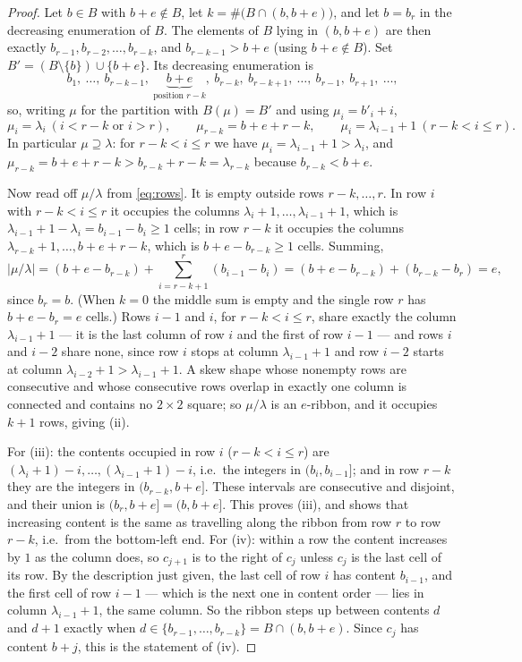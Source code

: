 \documentclass[11pt]{article}
\theoremstyle{definition}
\begin{document}
\begin{proof}
Let $b\in B$ with $b+e\notin B$, let $k=\#\bigl(B\cap(b,b+e)\bigr)$, and let $b=b_r$ in the
decreasing enumeration of $B$. The elements of $B$ lying in $(b,b+e)$ are then exactly
$b_{r-1},b_{r-2},\dots,b_{r-k}$, and $b_{r-k-1}>b+e$ (using $b+e\notin B$). Set
$B'=(B\setminus\{b\})\cup\{b+e\}$. Its decreasing enumeration is
\[
b_1,\ \dots,\ b_{r-k-1},\ \underbrace{b+e}_{\text{position }r-k},\ b_{r-k},\ b_{r-k+1},\ \dots,\ b_{r-1},\ b_{r+1},\ \dots,
\]
so, writing $\mu$ for the partition with $B(\mu)=B'$ and using $\mu_i=b'_i+i$,
\begin{equation}\label{eq:rows}
\mu_i=\lambda_i\ (i<r-k\text{ or }i>r),\qquad
\mu_{r-k}=b+e+r-k,\qquad
\mu_i=\lambda_{i-1}+1\ (r-k<i\le r).
\end{equation}
In particular $\mu\supseteq\lambda$: for $r-k<i\le r$ we have $\mu_i=\lambda_{i-1}+1>\lambda_i$,
and $\mu_{r-k}=b+e+r-k>b_{r-k}+r-k=\lambda_{r-k}$ because $b_{r-k}<b+e$.

Now read off $\mu/\lambda$ from \eqref{eq:rows}. It is empty outside rows $r-k,\dots,r$. In row
$i$ with $r-k<i\le r$ it occupies the columns $\lambda_i+1,\dots,\lambda_{i-1}+1$, which is
$\lambda_{i-1}+1-\lambda_i=b_{i-1}-b_i\ge1$ cells; in row $r-k$ it occupies the columns
$\lambda_{r-k}+1,\dots,b+e+r-k$, which is $b+e-b_{r-k}\ge1$ cells. Summing,
\[
|\mu/\lambda|=(b+e-b_{r-k})+\sum_{i=r-k+1}^{r}(b_{i-1}-b_i)=(b+e-b_{r-k})+(b_{r-k}-b_r)=e,
\]
since $b_r=b$. (When $k=0$ the middle sum is empty and the single row $r$ has $b+e-b_r=e$ cells.)
Rows $i-1$ and $i$, for $r-k<i\le r$, share exactly the column $\lambda_{i-1}+1$ --- it is the
last column of row $i$ and the first of row $i-1$ --- and rows $i$ and $i-2$ share none, since
row $i$ stops at column $\lambda_{i-1}+1$ and row $i-2$ starts at column
$\lambda_{i-2}+1>\lambda_{i-1}+1$. A skew shape whose nonempty rows are consecutive and whose
consecutive rows overlap in exactly one column is connected and contains no $2\times2$ square;
so $\mu/\lambda$ is an $e$-ribbon, and it occupies $k+1$ rows, giving (ii).

For (iii): the contents occupied in row $i$ ($r-k<i\le r$) are
$(\lambda_i+1)-i,\dots,(\lambda_{i-1}+1)-i$, i.e.\ the integers in $(b_i,b_{i-1}]$; and in row
$r-k$ they are the integers in $(b_{r-k},b+e]$. These intervals are consecutive and disjoint, and
their union is $(b_r,b+e]=(b,b+e]$. This proves (iii), and shows that increasing content is the
same as travelling along the ribbon from row $r$ to row $r-k$, i.e.\ from the bottom-left end.
For (iv): within a row the content increases by $1$ as the column does, so $c_{j+1}$ is to the
right of $c_j$ unless $c_j$ is the last cell of its row. By the description just given, the last
cell of row $i$ has content $b_{i-1}$, and the first cell of row $i-1$ --- which is the next one
in content order --- lies in column $\lambda_{i-1}+1$, the same column. So the ribbon steps up
between contents $d$ and $d+1$ exactly when $d\in\{b_{r-1},\dots,b_{r-k}\}=B\cap(b,b+e)$. Since
$c_j$ has content $b+j$, this is the statement of (iv).


\end{proof}
\end{document}
